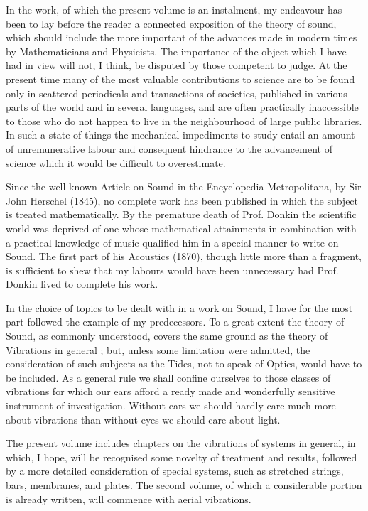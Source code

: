 In the work, of which the present volume is an instalment, my endeavour
has been to lay before the reader a connected exposition of the theory
of sound, which should include the more important of the advances made
in modern times by Mathematicians and Physicists. The importance of the
object which I have had in view will not, I think, be disputed by those
competent to judge. At the present time many of the most valuable
contributions to science are to be found only in scattered periodicals
and transactions of societies, published in various parts of the world
and in several languages, and are often practically inaccessible to
those who do not happen to live in the neighbourhood of large public
libraries. In such a state of things the mechanical impediments to study
entail an amount of unremunerative labour and consequent hindrance to
the advancement of science which it would be difficult to overestimate.

Since the well-known Article on Sound in the Encyclopedia Metropolitana,
by Sir John Herschel (1845), no complete work has been published in
which the subject is treated mathematically. By the premature death of
Prof. Donkin the scientific world was deprived of one whose mathematical
attainments in combination with a practical knowledge of music qualified
him in a special manner to write on Sound. The first part of his
Acoustics (1870), though little more than a fragment, is sufficient to
shew that my labours would have been unnecessary had Prof. Donkin lived
to complete his work.

In the choice of topics to be dealt with in a work on Sound, I have for
the most part followed the example of my predecessors. To a great extent
the theory of Sound, as commonly understood, covers the same ground as
the theory of Vibrations in general ; but, unless some limitation were
admitted, the consideration of such subjects as the Tides, not to speak
of Optics, would have to be included. As a general rule we shall confine
ourselves to those classes of vibrations for which our ears afford a
ready made and wonderfully sensitive instrument of investigation.
Without ears we should hardly care much more about vibrations than
without eyes we should care about light.

The present volume includes chapters on the vibrations of systems in
general, in which, I hope, will be recognised some novelty of treatment
and results, followed by a more detailed consideration of special
systems, such as stretched strings, bars, membranes, and plates. The
second volume, of which a considerable portion is already written, will
commence with aerial vibrations.

